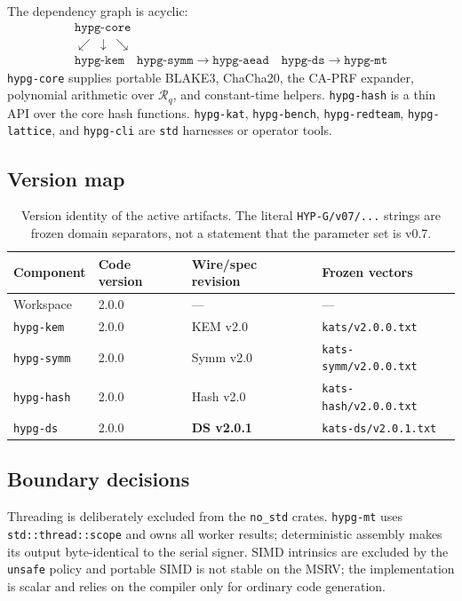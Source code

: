 \documentclass[11pt,a4paper]{article}
\theoremstyle{plain}
\theoremstyle{definition}
\theoremstyle{remark}
\newcommand{\Ring}{\mathcal{R}_q}
\begin{document}
The dependency graph is acyclic:
\[
\begin{array}{c}
\texttt{hypg-core}\\[-1mm]
\swarrow\ \downarrow\ \searrow\\[-1mm]
\texttt{hypg-kem}\quad
\texttt{hypg-symm}\to\texttt{hypg-aead}\quad
\texttt{hypg-ds}\to\texttt{hypg-mt}
\end{array}
\]
\texttt{hypg-core} supplies portable BLAKE3, ChaCha20, the CA-PRF
expander, polynomial arithmetic over $\Ring$, and constant-time
helpers.  \texttt{hypg-hash} is a thin API over the core hash
functions.  \texttt{hypg-kat}, \texttt{hypg-bench},
\texttt{hypg-redteam}, \texttt{hypg-lattice}, and \texttt{hypg-cli} are
\texttt{std} harnesses or operator tools.

\subsection{Version map}

\begin{table}[t]
\centering
\small
\begin{tabular}{@{}llll@{}}
\toprule
Component & Code version & Wire/spec revision & Frozen vectors \\
\midrule
Workspace & 2.0.0 & --- & --- \\
\texttt{hypg-kem} & 2.0.0 & KEM v2.0 & \texttt{kats/v2.0.0.txt} \\
\texttt{hypg-symm} & 2.0.0 & Symm v2.0 & \texttt{kats-symm/v2.0.0.txt} \\
\texttt{hypg-hash} & 2.0.0 & Hash v2.0 & \texttt{kats-hash/v2.0.0.txt} \\
\texttt{hypg-ds} & 2.0.0 & \textbf{DS v2.0.1} & \texttt{kats-ds/v2.0.1.txt} \\
\bottomrule
\end{tabular}
\caption{Version identity of the active artifacts.  The literal
\texttt{HYP-G/v07/...} strings are frozen domain separators, not a
statement that the parameter set is v0.7.}
\label{tab:versions}
\end{table}

\subsection{Boundary decisions}

Threading is deliberately excluded from the \texttt{no\_std} crates.
\texttt{hypg-mt} uses \texttt{std::thread::scope} and owns all worker
results; deterministic assembly makes its output byte-identical to the
serial signer.  SIMD intrinsics are excluded by the \texttt{unsafe}
policy and portable SIMD is not stable on the MSRV; the implementation
is scalar and relies on the compiler only for ordinary code generation.
\end{document}
